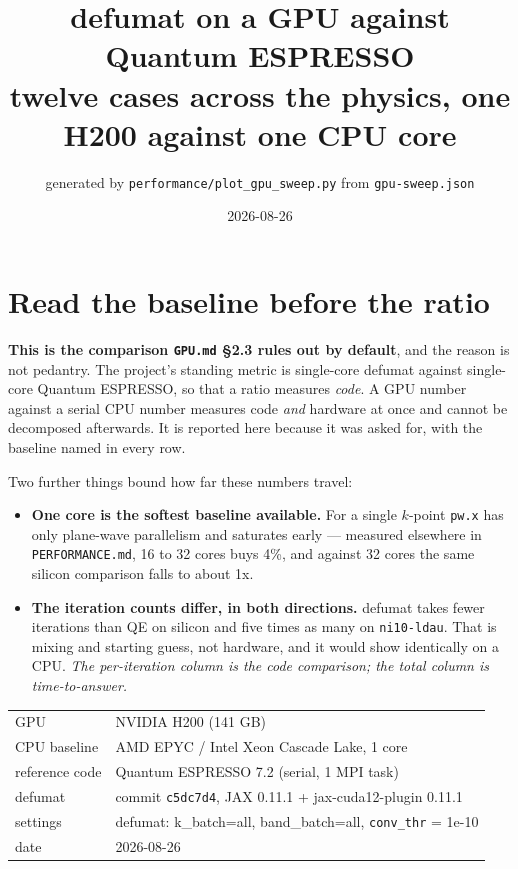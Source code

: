 \documentclass[11pt,a4paper]{article}
\title{defumat on a GPU against Quantum ESPRESSO\\[3pt]
\large twelve cases across the physics, one H200 against one CPU core}
\author{generated by \texttt{performance/plot\_gpu\_sweep.py} from \texttt{gpu-sweep.json}}
\date{2026-08-26}
\begin{document}
\maketitle

\section*{Read the baseline before the ratio}

\textbf{This is the comparison \texttt{GPU.md} \S2.3 rules out by default}, and the
reason is not pedantry. The project's standing metric is single-core defumat
against single-core Quantum ESPRESSO, so that a ratio measures \emph{code}. A GPU
number against a serial CPU number measures code \emph{and} hardware at once and
cannot be decomposed afterwards. It is reported here because it was asked for,
with the baseline named in every row.

Two further things bound how far these numbers travel:

\begin{itemize}
  \item \textbf{One core is the softest baseline available.} For a single
    $k$-point \texttt{pw.x} has only plane-wave parallelism and saturates early
    --- measured elsewhere in \texttt{PERFORMANCE.md}, 16 to 32 cores buys 4\%,
    and against 32 cores the same silicon comparison falls to about 1x.
  \item \textbf{The iteration counts differ, in both directions.} defumat takes
    fewer iterations than QE on silicon and five times as many on
    \texttt{ni10-ldau}. That is mixing and starting guess, not hardware, and it
    would show identically on a CPU. \emph{The per-iteration column is the code
    comparison; the total column is time-to-answer.}
\end{itemize}

\begin{center}
\begin{tabular}{ll}
\toprule
GPU & NVIDIA H200 (141 GB) \\
CPU baseline & AMD EPYC / Intel Xeon Cascade Lake, 1 core \\
reference code & Quantum ESPRESSO 7.2 (serial, 1 MPI task) \\
defumat & commit \texttt{c5dc7d4}, JAX 0.11.1 + jax-cuda12-plugin 0.11.1 \\
settings & defumat: k\_batch=all, band\_batch=all, \texttt{conv\_thr} = 1e-10 \\
date & 2026-08-26 \\
\bottomrule
\end{tabular}
\end{center}
\end{document}
